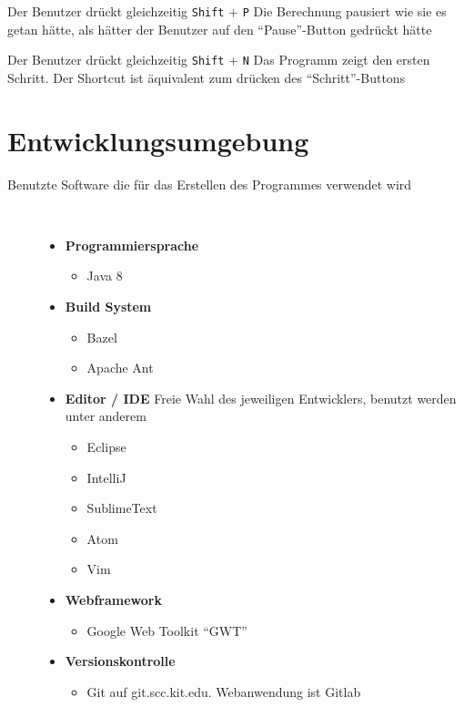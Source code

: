 \documentclass[parskip=full,11pt,twoside]{scrartcl}
\begin{document}
{Der Benutzer drückt gleichzeitig \texttt{Shift} + \texttt{P} }
{Die Berechnung pausiert wie sie es getan hätte, als hätter der Benutzer auf den \enquote{Pause}-Button gedrückt hätte}

{Der Benutzer drückt gleichzeitig \texttt{Shift} + \texttt{N} }
{Das Programm zeigt den ersten Schritt. Der Shortcut ist äquivalent zum drücken des \enquote{Schritt}-Buttons}

\newpage
\section{Entwicklungsumgebung}
  \begin{description}
	\item[Benutzte Software die für das Erstellen des Programmes verwendet wird]~\par
	\begin{itemize}
		\item \textbf{Programmiersprache}
		\begin{itemize}
			\item Java 8
		\end{itemize}
		\item \textbf{Build System}
		\begin{itemize}
			\item Bazel
			\item Apache Ant
		\end{itemize}
		\item \textbf{Editor / IDE}
		\newline Freie Wahl des jeweiligen Entwicklers, benutzt werden unter anderem
		\begin{itemize}
			\item Eclipse
			\item IntelliJ
			\item SublimeText
			\item Atom
			\item Vim
		\end{itemize}
		\item \textbf{Webframework}
		\begin{itemize}
			\item Google Web Toolkit \enquote{GWT}
		\end{itemize}
		\item \textbf{Versionskontrolle}
		\begin{itemize}
			\item Git auf git.scc.kit.edu. Webanwendung ist Gitlab

\end{itemize}
\end{itemize}
\end{description}
\end{document}
